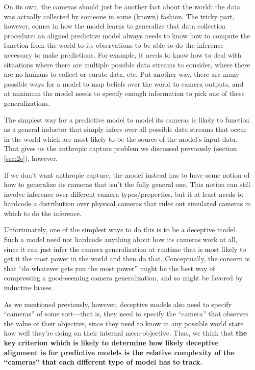 \documentclass[
  onecolumn,
  nonatbib,
]{miri-tech-article}
\begin{document}
On its own, the cameras should just be another fact about the world: the data was actually collected by someone in some (known) fashion. The tricky part, however, comes in how the model learns to generalize that data collection procedure: an aligned predictive model always needs to know how to compute the function from the world to its observations to be able to do the inference necessary to make predictions. For example, it needs to know how to deal with situations where there are multiple possible data streams to consider, where there are no humans to collect or curate data, etc. Put another way, there are many possible ways for a model to map beliefs over the world to camera outputs, and at minimum the model needs to specify enough information to pick one of these generalizations.

The simplest way for a predictive model to model its cameras is likely to function as a general inductor that simply infers over all possible data streams that occur in the world which are most likely to be the source of the model's input data. That gives us the anthropic capture problem we discussed previously (section \ref{sec:2e}), however.

If we don't want anthropic capture, the model instead has to have some notion of how to generalize its cameras that isn't the fully general one. This notion can still involve inference over different camera types/properties, but it at least needs to hardcode a distribution over physical cameras that rules out simulated cameras in which to do the inference.

Unfortunately, one of the simplest ways to do this is to be a deceptive model. Such a model need not hardcode anything about how its cameras work at all, since it can just infer the camera generalization at runtime that is most likely to get it the most power in the world and then do that. Conceptually, the concern is that ``do whatever gets you the most power'' might be the best way of compressing a good-seeming camera generalization, and so might be favored by inductive biases.

As we mentioned previously, however, deceptive models also need to specify ``cameras'' of some sort---that is, they need to specify the ``camera'' that observes the value of their objective, since they need to know in any possible world state how well they're doing on their internal mesa-objective. Thus, we think that \textbf{the key criterion which is likely to determine how likely deceptive alignment is for predictive models is the relative complexity of the ``cameras'' that each different type of model has to track.}
\end{document}
